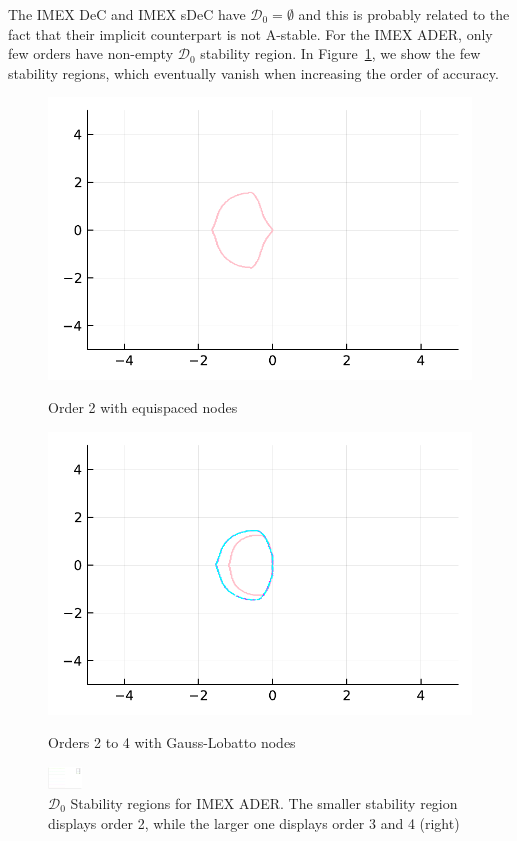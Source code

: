 The IMEX DeC and IMEX sDeC have $\mathcal{D}_0=\emptyset$ and this is probably related to the fact that their implicit counterpart is not A-stable.
For the IMEX ADER, only few orders have non-empty $\mathcal{D}_0$ stability region. In Figure~\ref{fig: HundsdorferD0_IMEXADER}, we show the few stability regions, which eventually vanish when increasing the order of accuracy.
\begin{figure}
	\centering
	\begin{minipage}[t]{0.45\textwidth}
		\includegraphics[width=\textwidth]{pdf/odepics/ImExD0_IMEXADER_equispaced.pdf}
		\centerline{Order 2 with equispaced nodes}
	\end{minipage}
	\begin{minipage}[t]{0.45\textwidth}
		\includegraphics[width=\textwidth]{pdf/odepics/ImExD0_IMEXADER_gaussLobatto.pdf}
		\centerline{Orders 2 to 4 with Gauss-Lobatto nodes}
	\end{minipage}
	\includegraphics[width=0.08\textwidth, trim={491 180 30 23}, clip]{pdf/odepics/colors_a-d_new_2-8_no_order.pdf}
	\caption{$\mathcal{D}_0$ Stability regions for IMEX ADER. The smaller stability region displays order 2, while the larger one displays order 3 and 4 (right)}
\label{fig: HundsdorferD0_IMEXADER}
\end{figure}

